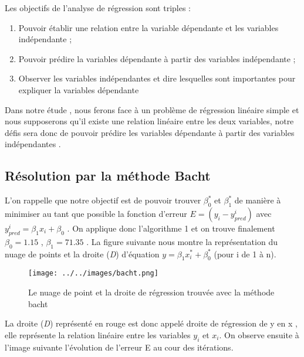 \documentclass[12pt,a4paper]{article}
\begin{document}
Les objectifs de l'analyse de régression sont triples : 

\begin{enumerate}
\item Pouvoir établir une relation entre la variable dépendante et les variables indépendante ; \\

\item Pouvoir prédire la variables dépendante à partir des variables indépendante ;\\

\item Observer les variables indépendantes et dire lesquelles sont importantes pour expliquer la variables dépendante \\
\end{enumerate}

Dans notre étude , nous ferons face à un problème de régression linéaire simple et nous supposerons qu'il existe une relation linéaire entre les deux variables, notre défis sera donc de pouvoir prédire les variables dépendante à partir des variables indépendantes .\\

\subsection{Résolution par la méthode Bacht}

L'on rappelle que notre objectif est de pouvoir trouver $\beta_{0}^{*}$ et $\beta_{1}^{*}$ de manière à minimiser au tant que possible la fonction d'erreur $E = (y_{i} - y_{pred}^{i})$ avec $y_{pred}^{i} = \beta_{1}x_{i} + \beta_{0} $ . On applique donc l'algorithme 1 et on trouve finalement $\beta_{0} = 1.15$ , $\beta_{1} = 71.35$ . La figure suivante nous montre la représentation du nuage de points et la droite (\textit{D}) d'équation $y = \beta_{1}x_{i}^{*} + \beta_{0}^{*} $ (pour i de 1 à n).\\


\begin{figure}[here]
\begin{center}
\texttt{[image: ../../images/bacht.png]}
\end{center}
\caption{Le nuage de point et la droite de régression trouvée avec la méthode bacht}
\end{figure}
\vspace{0.2in}


La droite (\textit{D}) représenté en rouge est donc appelé  droite de régression de y en x , elle représente la relation linéaire entre les variables $y_{i}$ et $x_{i}$. On observe ensuite à l'image suivante l'évolution de l'erreur E au cour des itérations. \\
\newpage
\end{document}
